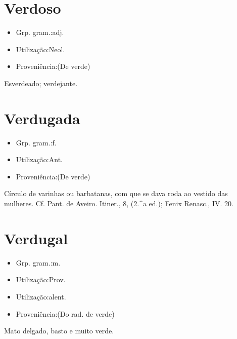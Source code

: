 \documentclass{article}
\begin{document}
\section{Verdoso}
\begin{itemize}
\item {Grp. gram.:adj.}
\end{itemize}
\begin{itemize}
\item {Utilização:Neol.}
\end{itemize}
\begin{itemize}
\item {Proveniência:(De \textunderscore verde\textunderscore )}
\end{itemize}
Esverdeado; verdejante.
\section{Verdugada}
\begin{itemize}
\item {Grp. gram.:f.}
\end{itemize}
\begin{itemize}
\item {Utilização:Ant.}
\end{itemize}
\begin{itemize}
\item {Proveniência:(De \textunderscore verde\textunderscore )}
\end{itemize}
Círculo de varinhas ou barbatanas, com que se dava roda ao vestido das mulheres. Cf. Pant. de Aveiro. \textunderscore Itiner.\textunderscore , 8, (2.^a ed.); \textunderscore Fenix Renasc.\textunderscore , IV. 20.
\section{Verdugal}
\begin{itemize}
\item {Grp. gram.:m.}
\end{itemize}
\begin{itemize}
\item {Utilização:Prov.}
\end{itemize}
\begin{itemize}
\item {Utilização:alent.}
\end{itemize}
\begin{itemize}
\item {Proveniência:(Do rad. de \textunderscore verde\textunderscore )}
\end{itemize}
Mato delgado, basto e muito verde.
\end{document}
